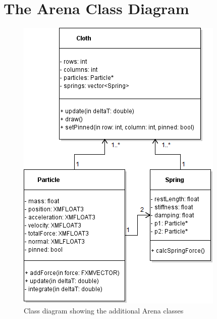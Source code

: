 \section{The Arena Class Diagram}
\label{sec:appendix2}
  \begin{figure}[h]
    \begin{center}
      \includegraphics{Figures/cycle_1_initial_design}
    \end{center}
    \caption{Class diagram showing the additional Arena classes}
    \label{fig:phase2}
  \end{figure}